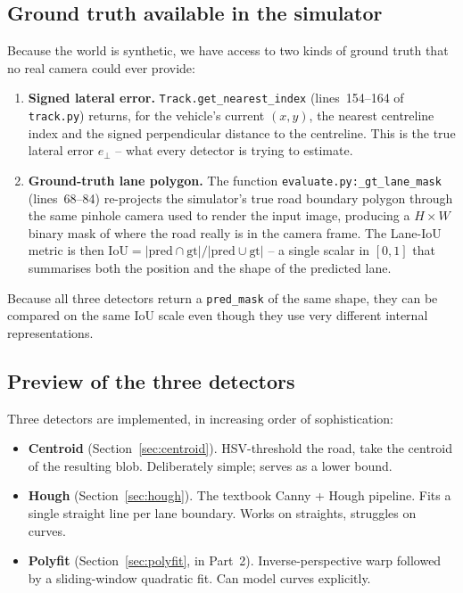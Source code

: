 \subsection{Ground truth available in the simulator}

Because the world is synthetic, we have access to two kinds of ground
truth that no real camera could ever provide:
\begin{enumerate}[leftmargin=2em,itemsep=2pt]
  \item \textbf{Signed lateral error.}
        \texttt{Track.get\_nearest\_index} (lines~154--164 of
        \texttt{track.py}) returns, for the vehicle's current
        $(x,y)$, the nearest centreline index and the signed
        perpendicular distance to the centreline. This is the true
        lateral error $e_\perp$ -- what every detector is trying to
        estimate.
  \item \textbf{Ground-truth lane polygon.} The function
        \texttt{evaluate.py:\_gt\_lane\_mask} (lines~68--84)
        re-projects the simulator's true road boundary polygon
        through the same pinhole camera used to render the input
        image, producing a $H\times W$ binary mask of where the road
        really is in the camera frame. The Lane-IoU metric is then
        $\text{IoU} = |\text{pred}\cap\text{gt}|/|\text{pred}\cup\text{gt}|$
        -- a single scalar in $[0,1]$ that summarises both the
        position and the shape of the predicted lane.
\end{enumerate}
Because all three detectors return a \texttt{pred\_mask} of the same
shape, they can be compared on the same IoU scale even though they
use very different internal representations.

\subsection{Preview of the three detectors}

Three detectors are implemented, in increasing order of sophistication:
\begin{itemize}[leftmargin=1.4em,itemsep=2pt]
  \item \textbf{Centroid} (Section~\ref{sec:centroid}). HSV-threshold
        the road, take the centroid of the resulting blob.
        Deliberately simple; serves as a lower bound.
  \item \textbf{Hough} (Section~\ref{sec:hough}). The textbook Canny
        + Hough pipeline. Fits a single straight line per lane
        boundary. Works on straights, struggles on curves.
  \item \textbf{Polyfit} (Section~\ref{sec:polyfit}, in Part~2).
        Inverse-perspective warp followed by a sliding-window
        quadratic fit. Can model curves explicitly.
\end{itemize}

